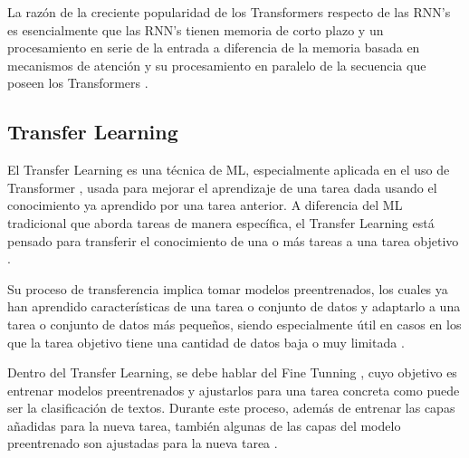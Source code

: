 La razón de la creciente popularidad de los Transformers respecto de las RNN's es esencialmente que las RNN's tienen memoria de corto plazo y un procesamiento en serie de la entrada a diferencia de la memoria basada en mecanismos de atención y su procesamiento en paralelo de la secuencia que poseen los Transformers \cite{vaswani2017attention}.


\subsection{Transfer Learning}
El Transfer Learning es una técnica de ML, especialmente aplicada en el uso de Transformer \cite{raffel2020exploring}, usada para mejorar el aprendizaje de una tarea dada usando el conocimiento ya aprendido por una tarea anterior. A diferencia del ML tradicional que aborda tareas de manera específica, el Transfer Learning está pensado para transferir el conocimiento de una o más tareas a una tarea objetivo \cite{torrey2010transfer}.

Su proceso de transferencia implica tomar modelos preentrenados, los cuales ya han aprendido características de una tarea o conjunto de datos y adaptarlo a una tarea o conjunto de datos más pequeños, siendo especialmente útil en casos en los que la tarea objetivo tiene una cantidad de datos baja o muy limitada \cite{weiss2016survey}.

Dentro del Transfer Learning, se debe hablar del Fine Tunning \cite{fu2022effectiveness}, cuyo objetivo es entrenar modelos preentrenados y ajustarlos para una tarea concreta como puede ser la clasificación de textos. Durante este proceso, además de entrenar las capas añadidas para la nueva tarea, también 
algunas de las capas del modelo preentrenado son ajustadas para la nueva tarea \cite{quinn2019dive}.